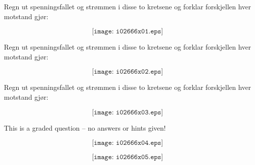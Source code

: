 

Regn ut spenningsfallet og strømmen i disse to kretsene og forklar forskjellen hver motstand gjør:

$$\texttt{[image: i02666x01.eps]}$$

\vskip 60pt

Regn ut spenningsfallet og strømmen i disse to kretsene og forklar forskjellen hver motstand gjør:

$$\texttt{[image: i02666x02.eps]}$$

\vskip 60pt

Regn ut spenningsfallet og strømmen i disse to kretsene og forklar forskjellen hver motstand gjør:

$$\texttt{[image: i02666x03.eps]}$$

\vfil 

\eject






This is a graded question -- no answers or hints given!







$$\texttt{[image: i02666x04.eps]}$$

$$\texttt{[image: i02666x05.eps]}$$




